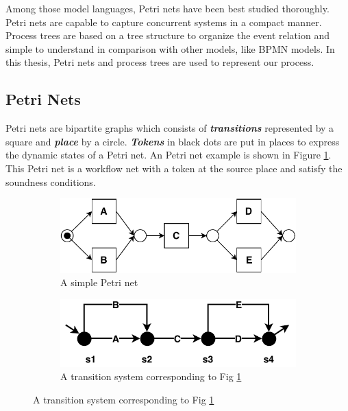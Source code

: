 Among those model languages, Petri nets have been best studied thoroughly. Petri nets are capable to capture concurrent systems in a compact manner. Process trees are based on a tree structure to organize the event relation and simple to understand in comparison with other models, like BPMN models. In this thesis, Petri nets and process trees are used to represent our process.
\subsection{Petri Nets}
Petri nets are bipartite graphs which consists of \textbf{\emph{transitions}} represented by a square and \textbf{\emph{place}} by a circle. \textbf{\emph{Tokens}} in black dots are put in places to express the dynamic states of a Petri net. An Petri net example is shown in Figure \ref{fig:pn-seq-2}. This Petri net is a workflow net with a token at the source place and satisfy the soundness conditions.  
\begin{figure}[!h]
	\centering
	\begin{subfigure}[b]{0.45\textwidth}
		\centering
		\includegraphics[width=\linewidth]{figures/preliminary/simple-petrinet.pdf}
		\caption{A simple Petri net}
		\label{fig:pn-seq-2}
	\end{subfigure}%
	\quad
	\begin{subfigure}[b]{0.5\textwidth}
		\centering
		\includegraphics[width=\linewidth]{figures/preliminary/transition-system.pdf}
		\caption{A transition system corresponding to Fig \ref{fig:pn-seq-2}}
		\label{fig:ts-model}
	\end{subfigure}%
	\label{fig:pn-ts}
\end{figure}  

